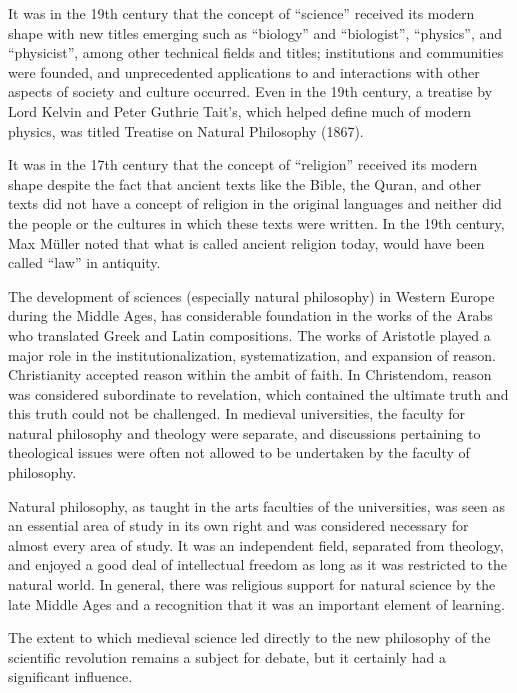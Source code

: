 \documentclass[
]{article}
\begin{document}
It was in the 19th century that the concept of ``science'' received its
modern shape with new titles emerging such as ``biology'' and
``biologist'', ``physics'', and ``physicist'', among other technical
fields and titles; institutions and communities were founded, and
unprecedented applications to and interactions with other aspects of
society and culture occurred. Even in the 19th century, a treatise by
Lord Kelvin and Peter Guthrie Tait's, which helped define much of modern
physics, was titled Treatise on Natural Philosophy (1867).

It was in the 17th century that the concept of ``religion'' received its
modern shape despite the fact that ancient texts like the Bible, the
Quran, and other texts did not have a concept of religion in the
original languages and neither did the people or the cultures in which
these texts were written. In the 19th century, Max Müller noted that
what is called ancient religion today, would have been called ``law'' in
antiquity.

The development of sciences (especially natural philosophy) in Western
Europe during the Middle Ages, has considerable foundation in the works
of the Arabs who translated Greek and Latin compositions. The works of
Aristotle played a major role in the institutionalization,
systematization, and expansion of reason. Christianity accepted reason
within the ambit of faith. In Christendom, reason was considered
subordinate to revelation, which contained the ultimate truth and this
truth could not be challenged. In medieval universities, the faculty for
natural philosophy and theology were separate, and discussions
pertaining to theological issues were often not allowed to be undertaken
by the faculty of philosophy.

Natural philosophy, as taught in the arts faculties of the universities,
was seen as an essential area of study in its own right and was
considered necessary for almost every area of study. It was an
independent field, separated from theology, and enjoyed a good deal of
intellectual freedom as long as it was restricted to the natural world.
In general, there was religious support for natural science by the late
Middle Ages and a recognition that it was an important element of
learning.

The extent to which medieval science led directly to the new philosophy
of the scientific revolution remains a subject for debate, but it
certainly had a significant influence.
\end{document}
